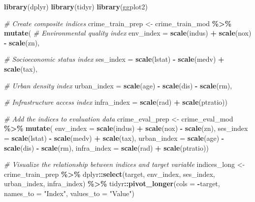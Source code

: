 \documentclass[
]{article}
\newenvironment{Shaded}{\begin{snugshade}}{\end{snugshade}}
\newcommand{\AttributeTok}[1]{\textcolor[rgb]{0.13,0.29,0.53}{#1}}
\newcommand{\CommentTok}[1]{\textcolor[rgb]{0.56,0.35,0.01}{\textit{#1}}}
\newcommand{\FunctionTok}[1]{\textcolor[rgb]{0.13,0.29,0.53}{\textbf{#1}}}
\newcommand{\NormalTok}[1]{#1}
\newcommand{\OtherTok}[1]{\textcolor[rgb]{0.56,0.35,0.01}{#1}}
\newcommand{\SpecialCharTok}[1]{\textcolor[rgb]{0.81,0.36,0.00}{\textbf{#1}}}
\newcommand{\StringTok}[1]{\textcolor[rgb]{0.31,0.60,0.02}{#1}}
\begin{document}
\begin{Shaded}
\begin{Highlighting}[]
\FunctionTok{library}\NormalTok{(dplyr)}
\FunctionTok{library}\NormalTok{(tidyr)}
\FunctionTok{library}\NormalTok{(ggplot2)}

\CommentTok{\# Create composite indices}
\NormalTok{crime\_train\_prep }\OtherTok{\textless{}{-}}\NormalTok{ crime\_train\_mod }\SpecialCharTok{\%\textgreater{}\%}
  \FunctionTok{mutate}\NormalTok{(}
    \CommentTok{\# Environmental quality index}
    \AttributeTok{env\_index =} \FunctionTok{scale}\NormalTok{(indus) }\SpecialCharTok{+} \FunctionTok{scale}\NormalTok{(nox) }\SpecialCharTok{{-}} \FunctionTok{scale}\NormalTok{(zn),}
    
    \CommentTok{\# Socioeconomic status index}
    \AttributeTok{ses\_index =} \FunctionTok{scale}\NormalTok{(lstat) }\SpecialCharTok{{-}} \FunctionTok{scale}\NormalTok{(medv) }\SpecialCharTok{+} \FunctionTok{scale}\NormalTok{(tax),}
    
    \CommentTok{\# Urban density index}
    \AttributeTok{urban\_index =} \FunctionTok{scale}\NormalTok{(age) }\SpecialCharTok{{-}} \FunctionTok{scale}\NormalTok{(dis) }\SpecialCharTok{{-}} \FunctionTok{scale}\NormalTok{(rm),}
    
    \CommentTok{\# Infrastructure access index}
    \AttributeTok{infra\_index =} \FunctionTok{scale}\NormalTok{(rad) }\SpecialCharTok{+} \FunctionTok{scale}\NormalTok{(ptratio))}

\CommentTok{\# Add the indices to evaluation data}
\NormalTok{crime\_eval\_prep }\OtherTok{\textless{}{-}}\NormalTok{ crime\_eval\_mod }\SpecialCharTok{\%\textgreater{}\%}
  \FunctionTok{mutate}\NormalTok{(}
    \AttributeTok{env\_index =} \FunctionTok{scale}\NormalTok{(indus) }\SpecialCharTok{+} \FunctionTok{scale}\NormalTok{(nox) }\SpecialCharTok{{-}} \FunctionTok{scale}\NormalTok{(zn),}
    \AttributeTok{ses\_index =} \FunctionTok{scale}\NormalTok{(lstat) }\SpecialCharTok{{-}} \FunctionTok{scale}\NormalTok{(medv) }\SpecialCharTok{+} \FunctionTok{scale}\NormalTok{(tax),}
    \AttributeTok{urban\_index =} \FunctionTok{scale}\NormalTok{(age) }\SpecialCharTok{{-}} \FunctionTok{scale}\NormalTok{(dis) }\SpecialCharTok{{-}} \FunctionTok{scale}\NormalTok{(rm),}
    \AttributeTok{infra\_index =} \FunctionTok{scale}\NormalTok{(rad) }\SpecialCharTok{+} \FunctionTok{scale}\NormalTok{(ptratio))}

\CommentTok{\# Visualize the relationship between indices and target variable}
\NormalTok{indices\_long }\OtherTok{\textless{}{-}}\NormalTok{ crime\_train\_prep }\SpecialCharTok{\%\textgreater{}\%}
\NormalTok{  dplyr}\SpecialCharTok{::}\FunctionTok{select}\NormalTok{(target, env\_index, ses\_index, urban\_index, infra\_index) }\SpecialCharTok{\%\textgreater{}\%}
\NormalTok{  tidyr}\SpecialCharTok{::}\FunctionTok{pivot\_longer}\NormalTok{(}\AttributeTok{cols =} \SpecialCharTok{{-}}\NormalTok{target, }\AttributeTok{names\_to =} \StringTok{"Index"}\NormalTok{, }\AttributeTok{values\_to =} \StringTok{"Value"}\NormalTok{)}


\end{Highlighting}
\end{Shaded}
\end{document}
